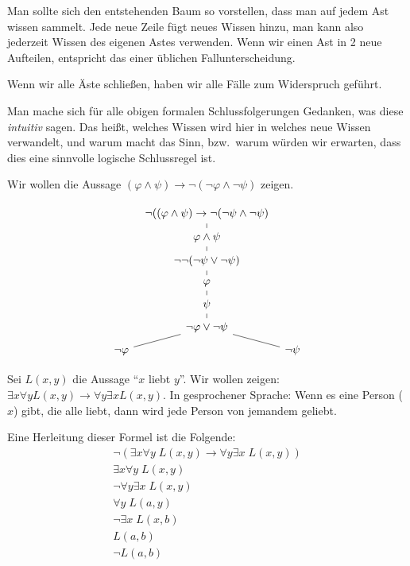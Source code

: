 \documentclass[ngerman]{scrartcl}
\begin{document}
\begin{remark}
  Man sollte sich den entstehenden Baum so vorstellen, dass man auf jedem Ast wissen sammelt. Jede neue Zeile fügt neues Wissen hinzu, man kann also jederzeit Wissen des eigenen Astes verwenden.
  Wenn wir einen Ast in 2 neue Aufteilen, entspricht das einer üblichen Fallunterscheidung.

  Wenn wir alle Äste schließen, haben wir alle Fälle zum Widerspruch geführt.
\end{remark}

\begin{exercise}
  Man mache sich für alle obigen formalen Schlussfolgerungen Gedanken,
  was diese \emph{intuitiv} sagen.
  Das heißt, welches Wissen wird hier in welches neue Wissen verwandelt,
  und warum macht das Sinn, bzw.~warum würden wir erwarten, dass dies eine
  sinnvolle logische Schlussregel ist.
\end{exercise}

\begin{example}
  Wir wollen die Aussage $(\varphi  \land \psi ) \to  \lnot (\lnot \varphi  \land \lnot \psi )$ zeigen.

  \[
    \begin{tikzcd}[column sep = tiny, row sep = tiny]
      & \lnot ((\varphi \land \psi ) \to \lnot (\lnot \psi  \land \lnot \psi ) \ar[-]{d} \\
      & \varphi  \land \psi  \ar[-]{d}\\
      & \lnot \lnot (\lnot \psi  \lor \lnot \psi )  \ar[-]{d}\\
      & \varphi   \ar[-]{d}\\
      & \psi   \ar[-]{d}\\
      & \lnot \varphi  \lor \lnot \psi
      \ar[-]{dr}
      \ar[-]{dl}
      \\
      \lnot \varphi  & & \lnot \psi 
    \end{tikzcd}
  \]
\end{example}

\begin{example}[Quantoren]
  Sei $L(x,y)$ die Aussage \enquote{$x$ liebt $y$}.
  Wir wollen zeigen: $\exists x \forall y L(x,y) \to \forall y \exists x L(x,y)$.
  In gesprochener Sprache: Wenn es eine Person ($x$) gibt, die alle liebt,
  dann wird jede Person von jemandem geliebt.

  Eine Herleitung dieser Formel ist die Folgende:
  \begin{gather*}
    \lnot (\exists x \forall y \; L(x,y) \to \forall y \exists x \; L(x,y)) \\
    \exists x \forall y \;L(x,y) \\
    \lnot \forall y \exists x \; L(x,y) \\
    \forall y \; L(a,y) \\
    \lnot \exists x \; L(x,b) \\
    L(a,b) \\
    \lnot L(a,b)
  \end{gather*}
\end{example}
\end{document}
